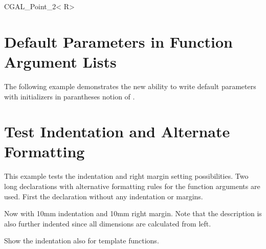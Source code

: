 \documentclass[12pt]{article}
\begin{document}
{%
\begin{ccClassTemplate}{CGAL_Point_2< R>}
\section{Default Parameters in Function Argument Lists}

The following example demonstrates the new ability to write default
parameters with initializers in parantheses notion of \CC.

\end{ccClassTemplate}



\section{Test Indentation and Alternate Formatting}

This example tests the indentation and right margin setting
possibilities. Two long declarations with alternative formatting rules
for the function arguments are used. First the  declaration without
any indentation or margins.


Now with 10mm indentation and 10mm right margin. Note that the
description is also further indented since all dimensions are
calculated from left.

\ccTagDefaults
\def\ind{\hspace*{7mm}}
\ccTexHtml{\ccwIndent=10mm \ccwRightMargin=10mm}{}

\renewcommand{\ccLongParamLayout}{\ccTrue}


Show the indentation also for template functions.


}
\end{document}
